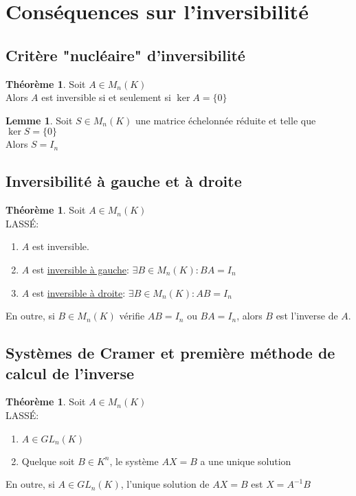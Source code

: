 \documentclass[10pt,a4paper]{article}
\theoremstyle{definition}
\newtheorem{theorem}[proposition]{Théorème}
\newtheorem{lemme}[proposition]{Lemme}
\begin{document}
\section{Conséquences sur l'inversibilité}
\subsection{Critère "nucléaire" d'inversibilité}
\begin{theorem}
Soit $A \in M_n(K)$ \\
Alors $A$ est inversible si et seulement si $\ker A = \{ 0 \}$
\end{theorem}
\begin{lemme}
Soit $S \in M_n(K)$ une matrice échelonnée réduite et telle que $\ker S = \{ 0 \}$ \\
Alors $S = I_n$
\end{lemme}

\subsection{Inversibilité à gauche et à droite}
\begin{theorem}
Soit $A \in M_n(K)$ \\
LASSÉ:
\begin{enumerate}
\item $A$ est inversible.
\item $A$ est \uline{inversible à gauche}: $\exists B \in M_n(K): BA = I_n$
\item $A$ est \uline{inversible à droite}: $\exists B \in M_n(K): AB = I_n$
\end{enumerate}
En outre, si $B \in M_n(K)$ vérifie $AB = I_n$ ou $BA = I_n$, alors $B$ est l'inverse de $A$.
\end{theorem}

\pagebreak

\subsection{Systèmes de Cramer et première méthode de calcul de l'inverse}
\begin{theorem}
Soit $A \in M_n(K)$ \\
LASSÉ:
\begin{enumerate}
\item $A \in GL_n(K)$
\item Quelque soit $B \in K^n$, le système $AX = B$ a une unique solution
\end{enumerate}
En outre, si $A \in GL_n(K)$, l'unique solution de $AX = B$ est $X = A^{-1}B$
\end{theorem}
\end{document}
